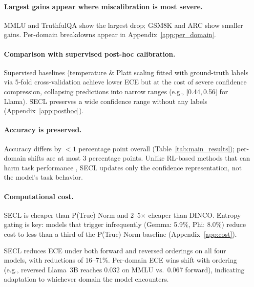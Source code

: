 \documentclass[11pt]{article}
\begin{document}
\paragraph{Largest gains appear where miscalibration is most severe.}
MMLU and TruthfulQA show the largest drop; GSM8K and ARC show smaller gains. Per-domain breakdowns appear in Appendix~\ref{app:per_domain}.

\paragraph{Comparison with supervised post-hoc calibration.}
Supervised baselines (temperature \& Platt scaling \cite{platt_probabilistic_1999} fitted with ground-truth labels via 5-fold cross-validation achieve lower ECE but at the cost of severe confidence compression, collapsing predictions into narrow ranges (e.g., [0.44,\,0.56] for Llama). SECL preserves a wide confidence range without any labels (Appendix~\ref{app:posthoc}).

\paragraph{Accuracy is preserved.}
Accuracy differs by $<1$ percentage point overall (Table~\ref{tab:main_results}); per-domain shifts are at most 3 percentage points. Unlike RL-based methods that can harm task performance \cite{damani_binary_2025, stangel_rewarding_2025}, SECL updates only the confidence representation, not the model's task behavior.

\paragraph{Computational cost.}
SECL is cheaper than P(True) Norm and 2--5$\times$ cheaper than DINCO. Entropy gating is key: models that trigger infrequently (Gemma: 5.9\%, Phi: 8.0\%) reduce cost to less than a third of the P(True) Norm baseline (Appendix~\ref{app:cost}).

SECL reduces ECE under both forward and reversed orderings on all four models, with reductions of 16--71\%. Per-domain ECE wins shift with ordering (e.g., reversed Llama~3B reaches 0.032 on MMLU vs.\ 0.067 forward), indicating adaptation to whichever domain the model encounters.
\end{document}
